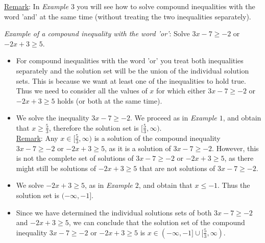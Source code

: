 \documentclass[12pt]{article}
\begin{document}
\underline{Remark}: In \textit{Example $3$} you will see how to solve compound inequalities with the word 'and' at the same time (without treating the two inequalities separately).

\textit{Example of a compound inequality with the word 'or'}: Solve $3x-7\geq -2$ or $-2x+3\geq 5$.
\begin{itemize}
\item For compound inequalities with the word 'or' you treat both inequalities separately and the solution set will be the union of the individual solution sets. This is because we want at least one of the inequalities to hold true. Thus we need to consider all the values of $x$ for which either $3x-7\geq -2$ or $-2x+3\geq 5$ holds (or both at the same time). 
\item We solve the inequality $3x-7\geq -2$. We proceed as in \textit{Example $1$}, and obtain that $x\geq \frac{5}{3}$, therefore the solution set is $[\frac{5}{3}, \infty)$.\\
\underline{Remark}: Any $x\in [\frac{5}{3}, \infty)$ is a solution of the compound inequality $3x-7\geq -2$ or $-2x+3\geq 5$, as it is a solution of $3x-7\geq -2$. However, this is not the complete set of solutions of $3x-7\geq -2$ or $-2x+3\geq 5$, as there might still be solutions of $-2x+3\geq 5$ that are not solutions of $3x-7\geq -2$.
\item We solve $-2x+3\geq 5$, as in \textit{Example $2$}, and obtain that $x\leq -1$. Thus the solution set is $(-\infty, -1]$. 
\item Since we have determined the individual solutions sets of both $3x-7\geq -2$ and $-2x+3\geq 5$, we can conclude that the solution set of the compound inequality $3x-7\geq -2$ or $-2x+3\geq 5$ is $x\in  (-\infty, -1] \cup [\frac{5}{3}, \infty)$.
\end{itemize}
\end{document}
